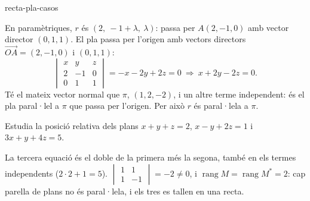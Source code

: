 \begin{apartats}
\begin{tria}{recta-pla-casos}
\begin{solucio}
En paramètriques, $r$ és $(2,\ -1+\lambda,\ \lambda)$: passa per $A(2,-1,0)$ amb vector director
$(0,1,1)$. El pla passa per l'origen amb vectors directors $\overrightarrow{OA}=(2,-1,0)$ i $(0,1,1)$:
\[
\begin{vmatrix}x&y&z\\2&-1&0\\0&1&1\end{vmatrix}=-x-2y+2z=0\ \Longrightarrow\ x+2y-2z=0.
\]
Té el mateix vector normal que $\pi$, $(1,2,-2)$, i un altre terme independent: és el pla paral·lel a
$\pi$ que passa per l'origen. Per això $r$ és paral·lela a $\pi$.
\end{solucio}
\end{tria}

\begin{nomesllarg}
Estudia la posició relativa dels plans $x+y+z=2$, $x-y+2z=1$ i $3x+y+4z=5$.

\begin{solucio}
La tercera equació és el doble de la primera més la segona, també en els termes independents
($2\cdot2+1=5$). $\begin{vmatrix}1&1\\1&-1\end{vmatrix}=-2\ne0$, i
$\operatorname{rang}M=\operatorname{rang}M^*=2$: cap parella de plans no és paral·lela, i els tres es
tallen en una recta.
\end{solucio}
\end{nomesllarg}

\end{apartats}
